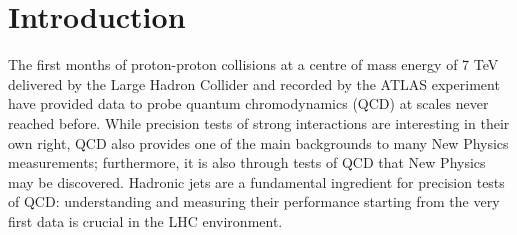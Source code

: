 
\chapter{Introduction}

The first months of proton-proton collisions at a centre of mass energy of 7 TeV delivered by
the Large Hadron Collider and recorded by the ATLAS experiment have provided data to
probe quantum chromodynamics (QCD) at scales never reached before. While precision tests
of strong interactions are interesting in their own right, QCD also provides one of the main
backgrounds to many New Physics measurements; furthermore, it is also through tests of QCD
that New Physics may be discovered. Hadronic jets are a fundamental ingredient for precision
tests of QCD: understanding and measuring their performance starting from the very first data
is crucial in the LHC environment. %



